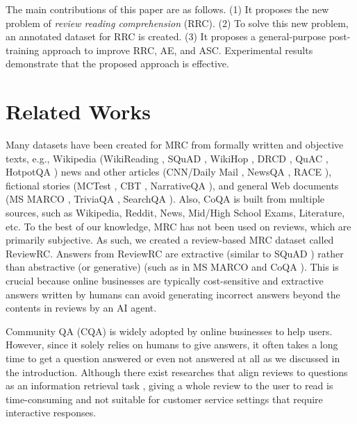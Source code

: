 \documentclass[11pt,a4paper]{article}
\begin{document}
The main contributions of this paper are as follows.
(1) It proposes the new problem of \textit{review reading comprehension} (RRC).
(2) To solve this new problem, an annotated dataset for RRC is created.
(3) It proposes a general-purpose post-training approach to improve RRC, AE, and ASC.
Experimental results demonstrate that the proposed approach is effective. 

\section{Related Works}
\label{sec:rel}

Many datasets have been created for MRC from formally written and objective texts, e.g., Wikipedia (WikiReading \cite{hewlett2016wikireading}, SQuAD \cite{rajpurkar2016squad,rajpurkar2018know}, WikiHop \cite{welbl2018constructing}, DRCD \cite{shao2018drcd}, QuAC \cite{choi2018quac}, HotpotQA \cite{yang2018hotpotqa}) news and other articles (CNN/Daily Mail \cite{hermann2015teaching}, NewsQA \cite{trischler2016newsqa}, RACE \cite{lai2017race}), fictional stories (MCTest \cite{richardson2013mctest}, CBT \cite{hill2015goldilocks}, NarrativeQA \cite{kovcisky2018narrativeqa}), and general Web documents (MS MARCO \cite{nguyen2016ms}, TriviaQA \cite{joshi2017triviaqa}, SearchQA \cite{dunn2017searchqa} ). 
Also, CoQA \cite{reddy2018coqa} is built from multiple sources, such as Wikipedia, Reddit, News, Mid/High School Exams, Literature, etc.
To the best of our knowledge, MRC has not been used on reviews, which are primarily subjective. As such, we created a review-based MRC dataset called ReviewRC.
Answers from ReviewRC are extractive (similar to SQuAD \cite{rajpurkar2016squad,rajpurkar2018know}) rather than abstractive (or generative) (such as in MS MARCO \cite{nguyen2016ms} and CoQA \cite{reddy2018coqa}).
This is crucial because online businesses are typically cost-sensitive and extractive answers written by humans can avoid generating incorrect answers beyond the contents in reviews by an AI agent.

Community QA (CQA) is widely adopted by online businesses \cite{mcauley2016addressing} to help users.
However, since it solely relies on humans to give answers, it often takes a long time to get a question answered or even not answered at all as we discussed in the introduction.
Although there exist researches that align reviews to questions as an information retrieval task \cite{mcauley2016addressing,yu2018aware}, giving a whole review to the user to read is time-consuming and not suitable for customer service settings that require interactive responses.
\end{document}
